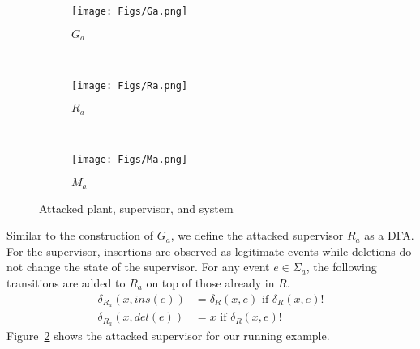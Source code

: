 \begin{figure}[thpb]
\begin{subfigure}[t]{0.45\columnwidth}
\centering
\texttt{[image: Figs/Ga.png]}
\caption{$G_a$}
\label{fig:Ga}
\end{subfigure}
\ 
\begin{subfigure}[t]{0.45\columnwidth}
\centering
\texttt{[image: Figs/Ra.png]}
\caption{$R_a$}
\label{fig:Ra}
\end{subfigure}
\\
\begin{subfigure}[t]{1\columnwidth}
\centering
\texttt{[image: Figs/Ma.png]}
\caption{$M_a$}
\label{fig:Ma}
\end{subfigure}
\caption{Attacked plant, supervisor, and system}
\label{fig:attacked-models}
\vspace{-2em}
\end{figure}


Similar to the construction of $G_a$, we define the attacked supervisor $R_a$ as a DFA.
For the supervisor, insertions are observed as legitimate events while deletions do not change the state of the supervisor.
For any event $e\in \Sigma_a$, the following transitions are added to $R_a$ on top of those already in $R$.
\begin{align}
\delta_{R_a}(x,ins(e)) &= \delta_R(x,e) \text{ if } \delta_R(x,e)! \label{eq:ins_sup}\\
\delta_{R_a}(x,del(e)) &= x \text{ if } \delta_R(x,e)! \label{eq:del_sup}
\end{align}
Figure~\ref{fig:Ra} shows the attacked supervisor for our running example.

